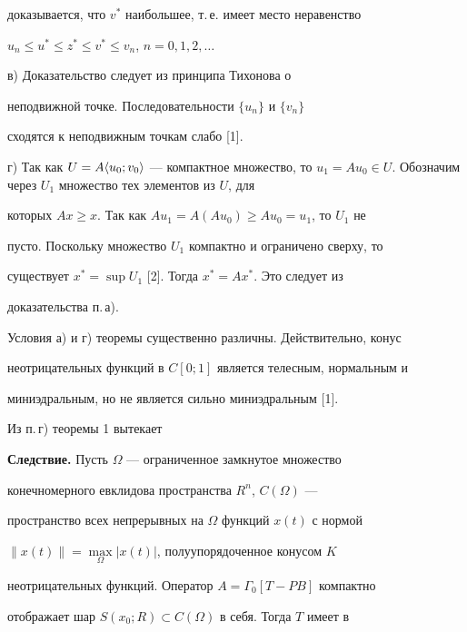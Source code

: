 \begin{pf}
доказывается, что $v^*$ наибольшее, т.\,е. имеет место неравенство 


$u_n\le u^*\le z^*\le v^*\le v_n$, $n=0,1,2,\dotsc$ 


 


в) Доказательство следует из принципа Тихонова о 


неподвижной точке. Последовательности $\{u_n\}$ и $\{v_n\}$ 


сходятся к неподвижным точкам слабо [1]. 


 


г) Так как $U=A\la u_0;v_0\ra$ --- компактное множество, то $u_1=A 


u_0\in U$. Обозначим через $U_1$ множество тех элементов из $U$, для 


которых $Ax\ge x$. Так как $A u_1=A(A u_0)\ge A u_0=u_1$, то $U_1$ не 


пусто. Поскольку множество $U_1$ компактно и ограничено сверху, то 


существует $x^*=\sup U_1$ [2]. Тогда $x^*=Ax^*$. Это следует из 


доказательства п.\,а). 


\end{pf} 


 


Условия а) и г) теоремы существенно различны. Действительно, конус 


неотрицательных функций в $C[0;1]$ является телесным, нормальным и 


миниэдральным, но не является сильно миниэдральным [1]. 


 


Из п.\,г) теоремы 1 вытекает 


\medskip 


 


{\bf Следствие.} Пусть $\Omega$ --- ограниченное замкнутое множество 


конечномерного евклидова пространства $R^n$, $C(\Omega)$ --- 


пространство всех непрерывных на $\Omega$ функций $x(t)$ с нормой 


$\|x(t)\|=\max\limits_\Omega|x(t)|$, полуупорядоченное конусом $K$ 


неотрицательных функций. Оператор $A=\Gamma_0[T-P B]$ компактно 


отображает шар $S(x_0;R)\subset C(\Omega)$ в себя. Тогда $T$ имеет в 


